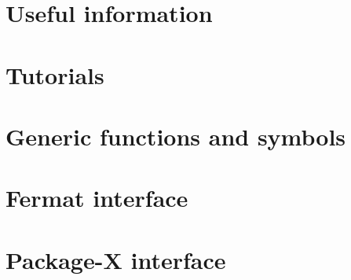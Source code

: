 
\chapter{Useful information}




\chapter{Tutorials}










\chapter{Generic functions and symbols}







\chapter{Fermat interface}












\chapter{Package-X interface}





























